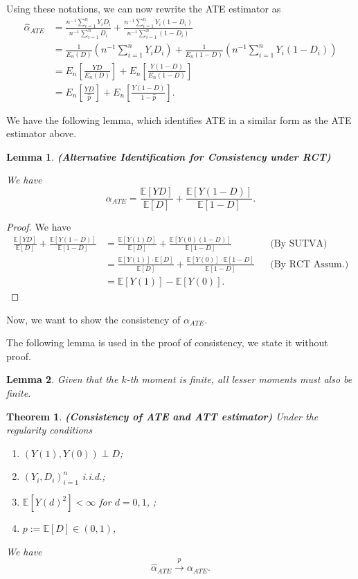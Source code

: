 \documentclass[11pt,a4paper]{amsart}
\theoremstyle{plain}
\newtheorem{theorem}{Theorem}
\newtheorem{lemma}{Lemma}
\theoremstyle{definition}
\begin{document}
 	Using these notations, we can now rewrite the ATE estimator as 
 	\[	\begin{aligned}
 		\hat{\alpha}_{ATE} &= \frac{n^{-1}\sum_{i = 1}^{n}Y_{i}D_{i}}{n^{-1}\sum_{i = 1}^{n}D_{i}} + \frac{n^{-1}\sum_{i = 1}^{n}Y_{i}(1-D_{i})}{n^{-1}\sum_{i=1}^{n}(1-D_{i})}	\\
 		&= \frac{1}{E_{n}(D)} (n^{-1}\sum_{i = 1}^{n}Y_{i}D_{i}) + \frac{1}{E_{n}(1-D)} (n^{-1}\sum_{i=1}^{n}Y_{i}(1-D_{i}))\\
 		&= E_{n}[\frac{YD}{E_{n}(D)}] + E_{n}[\frac{Y(1-D)}{E_{n}(1-D)}]	\\
 		&=  E_{n}[\frac{YD}{\hat{p}}] + E_{n}[\frac{Y(1-D)}{1-\hat{p}}].
 	\end{aligned}	\]
 	
 	We have the following lemma, which identifies ATE in a similar form as the ATE estimator above.
 		\begin{lemma}\label{alt. ident. RCT}
 			\textbf{(Alternative Identification for Consistency under RCT)}
 			
 		We have
 		\[	\alpha_{ATE} = \frac{\mathbb{E}[YD]}{\mathbb{E}[D]} + \frac{\mathbb{E}[Y(1-D)]}{\mathbb{E}[1-D]}.	\]
 	\end{lemma}
 	\begin{proof}
 		We have 
 		\[	\begin{aligned}
 	 \frac{\mathbb{E}[YD]}{\mathbb{E}[D]} + \frac{\mathbb{E}[Y(1-D)]}{\mathbb{E}[1-D]} &=  \frac{\mathbb{E}[Y(1)D]}{\mathbb{E}[D]} + \frac{\mathbb{E}[Y(0)(1-D)]}{\mathbb{E}[1-D]} &&\text{(By SUTVA)}	\\
 	 &= \frac{\mathbb{E}[Y(1)] \cdot \mathbb{E}[D]}{\mathbb{E}[D]} + \frac{\mathbb{E}[Y(0)] \cdot \mathbb{E}[1-D]}{\mathbb{E}[1-D]} &&\text{(By RCT Assum.)}	\\
 	 &= \mathbb{E}[Y(1)] - \mathbb{E}[Y(0)].
 		\end{aligned}	\]
 	\end{proof}
 	Now, we want to show the consistency of $\alpha_{ATE}$.\par 
 	The following lemma is used in the proof of consistency, we state it without proof.
 	\begin{lemma}\label{finite moments}
 		Given that the $k$-th moment is finite, all lesser moments must also be finite.
 	\end{lemma}
 
 	\vspace{30pt}
 	
 	\begin{theorem}
 		\textbf{(Consistency of ATE and ATT estimator)} Under the regularity conditions
 		\begin{enumerate}
 			\item $(Y(1),Y(0)) \perp D$;
 			\item $(Y_{i},D_{i})_{i=1}^{n}$ i.i.d.;
 			\item $\mathbb{E}[Y(d)^{2}] < \infty$ for $d = 0,1$, ;
 			\item $p := \mathbb{E}[D] \in (0,1)$,
 		\end{enumerate}
 	We have 
 	\[	\hat{\alpha}_{ATE} \stackrel{p}{\longrightarrow} \alpha_{ATE}.	\]
 	\end{theorem}
\end{document}
